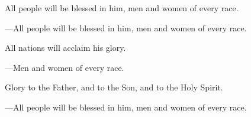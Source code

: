 \responsory

\begin{hangpar}
All people will be blessed in him, men and women of every race.

{\color{red}---\thinspace }All people will be blessed in him, men and women of every race.

\medskip All nations will acclaim his glory.

{\color{red}---\thinspace }Men and women of every race.

\medskip Glory to the Father, and to the Son, and to the Holy Spirit.

{\color{red}---\thinspace }All people will be blessed in him, men and women of every race.
\end{hangpar}
